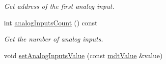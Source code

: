 \begin{DoxyCompactItemize}
\begin{DoxyCompactList}\small\item\em Get address of the first analog input. \end{DoxyCompactList}\item 
\hypertarget{classmdt_device_ios_a904069e2e641c92291226ea2524eadb3}{
int \hyperlink{classmdt_device_ios_a904069e2e641c92291226ea2524eadb3}{analogInputsCount} () const }
\label{classmdt_device_ios_a904069e2e641c92291226ea2524eadb3}

\begin{DoxyCompactList}\small\item\em Get the number of analog inputs. \end{DoxyCompactList}\item 
\hypertarget{classmdt_device_ios_aeaa1a401ec975a67f87c62d4abae65ee}{
void \hyperlink{classmdt_device_ios_aeaa1a401ec975a67f87c62d4abae65ee}{setAnalogInputsValue} (const \hyperlink{classmdt_value}{mdtValue} \&value)}
\label{classmdt_device_ios_aeaa1a401ec975a67f87c62d4abae65ee}


\end{DoxyCompactItemize}
